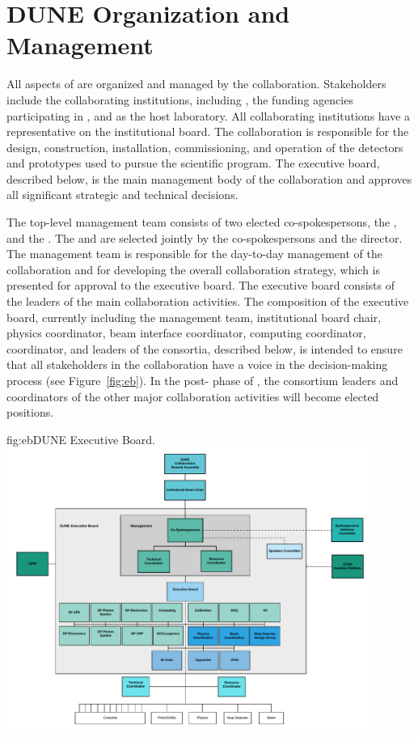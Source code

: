\section{DUNE Organization and Management}

All aspects of  are organized and managed by the  collaboration.  Stakeholders include the collaborating institutions, including , the funding agencies participating in , and  as the host laboratory.  All collaborating institutions have a representative on the  institutional board. The collaboration is responsible for the design, construction, installation, commissioning, and operation of the detectors and prototypes used to pursue the scientific program. The  executive board, described below, is the main management body of the collaboration and approves all significant strategic and technical decisions.

The top-level  management team consists of two elected co-spokespersons, the , and the . The  and  are selected jointly by the co-spokespersons and the  director. The management team is responsible for the day-to-day management of the collaboration and for developing the overall collaboration strategy, which is presented for approval to the executive board. The executive board consists of the leaders of the main collaboration activities. The composition of the executive board, currently including the  management team, institutional board chair, physics coordinator, beam interface coordinator, computing coordinator,  coordinator, and leaders of the  consortia, described below, is intended to ensure
that all stakeholders in the collaboration have a voice in the decision-making process (see Figure~\ref{fig:eb}). 
In the post- phase of , the consortium leaders and coordinators of the other major collaboration activities will become elected positions.


\begin{dunefigure}	
{fig:eb}{DUNE Executive Board.}
\includegraphics[width=0.9\textwidth]{graphics/eb.pdf}
\end{dunefigure}

